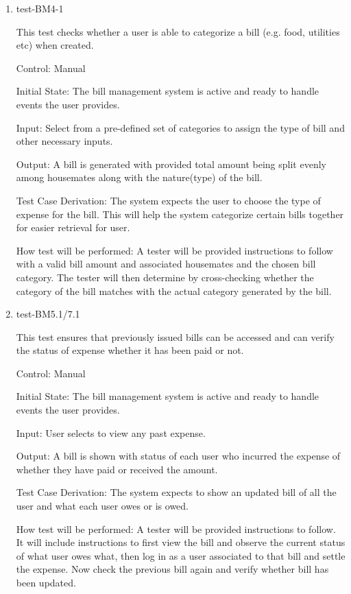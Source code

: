 \documentclass[12pt, titlepage]{article}
\begin{document}
\begin{enumerate}
\item{test-BM4-1\\}

This test checks whether a user is able to categorize a bill (e.g. food, utilities etc) when created. 

Control: Manual
					
Initial State: The bill management system is active and ready to handle events the user provides.
					
Input: Select from a pre-defined set of categories to assign the type of bill and other necessary inputs.
					
Output: A bill is generated with provided total amount being split evenly among housemates along with the nature(type) of the bill.

Test Case Derivation: The system expects the user to choose the type of expense for the bill. This will help the system categorize certain bills together for easier retrieval for user.
					
How test will be performed: A tester will be provided instructions to follow with a valid bill amount and associated housemates and the chosen bill category. The tester will then determine by cross-checking whether the category of the bill matches with the actual category generated by the bill.

\item{test-BM5.1/7.1\\}

This test ensures that previously issued bills can be accessed and can verify the status of expense whether it has been paid or not.

Control: Manual
					
Initial State: The bill management system is active and ready to handle events the user provides.
					
Input: User selects to view any past expense. 
					
Output: A bill is shown with status of each user who incurred the expense of whether they have paid or received the amount.

Test Case Derivation: The system expects to show an updated bill of all the user and what each user owes or is owed.

How test will be performed: A tester will be provided instructions to follow. It will include instructions to first view the bill and observe the current status of what user owes what, then log in as a user associated to that bill and settle the expense. Now check the previous bill again and verify whether bill has been updated.


\end{enumerate}
\end{document}
